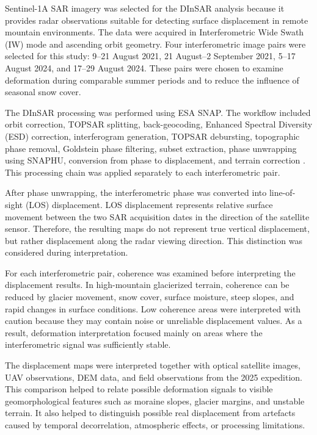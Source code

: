 \documentclass[12pt,a4paper]{report}
\begin{document}
Sentinel-1A SAR imagery was selected for the DInSAR analysis because it provides radar observations suitable for detecting surface displacement in remote mountain environments. The data were acquired in Interferometric Wide Swath (IW) mode and ascending orbit geometry. Four interferometric image pairs were selected for this study: 9–21 August 2021, 21 August–2 September 2021, 5–17 August 2024, and 17–29 August 2024. These pairs were chosen to examine deformation during comparable summer periods and to reduce the influence of seasonal snow cover.

The DInSAR processing was performed using ESA SNAP. The workflow included orbit correction, TOPSAR splitting, back-geocoding, Enhanced Spectral Diversity (ESD) correction, interferogram generation, TOPSAR debursting, topographic phase removal, Goldstein phase filtering, subset extraction, phase unwrapping using SNAPHU, conversion from phase to displacement, and terrain correction \cite{ESA2022, Hanssen2001}. This processing chain was applied separately to each interferometric pair.

After phase unwrapping, the interferometric phase was converted into line-of-sight (LOS) displacement. LOS displacement represents relative surface movement between the two SAR acquisition dates in the direction of the satellite sensor. Therefore, the resulting maps do not represent true vertical displacement, but rather displacement along the radar viewing direction. This distinction was considered during interpretation.

For each interferometric pair, coherence was examined before interpreting the displacement results. In high-mountain glacierized terrain, coherence can be reduced by glacier movement, snow cover, surface moisture, steep slopes, and rapid changes in surface conditions. Low coherence areas were interpreted with caution because they may contain noise or unreliable displacement values. As a result, deformation interpretation focused mainly on areas where the interferometric signal was sufficiently stable.

The displacement maps were interpreted together with optical satellite images, UAV observations, DEM data, and field observations from the 2025 expedition. This comparison helped to relate possible deformation signals to visible geomorphological features such as moraine slopes, glacier margins, and unstable terrain. It also helped to distinguish possible real displacement from artefacts caused by temporal decorrelation, atmospheric effects, or processing limitations.
\end{document}
